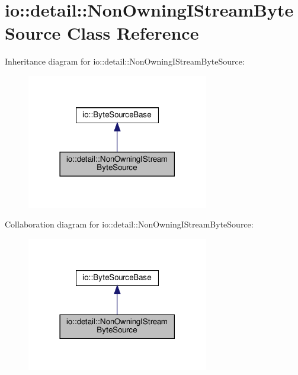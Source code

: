 \hypertarget{classio_1_1detail_1_1NonOwningIStreamByteSource}{}\section{io\+:\+:detail\+:\+:Non\+Owning\+I\+Stream\+Byte\+Source Class Reference}
\label{classio_1_1detail_1_1NonOwningIStreamByteSource}


Inheritance diagram for io\+:\+:detail\+:\+:Non\+Owning\+I\+Stream\+Byte\+Source\+:\nopagebreak
\begin{figure}[H]
\begin{center}
\leavevmode
\includegraphics[width=225pt]{classio_1_1detail_1_1NonOwningIStreamByteSource__inherit__graph}
\end{center}
\end{figure}


Collaboration diagram for io\+:\+:detail\+:\+:Non\+Owning\+I\+Stream\+Byte\+Source\+:\nopagebreak
\begin{figure}[H]
\begin{center}
\leavevmode
\includegraphics[width=225pt]{classio_1_1detail_1_1NonOwningIStreamByteSource__coll__graph}
\end{center}
\end{figure}
